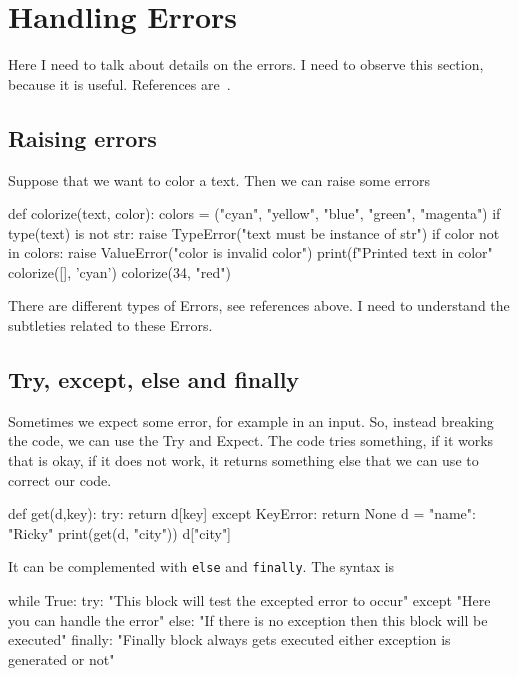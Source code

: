 \section{Handling Errors}

Here I need to talk about details on the errors. I need to observe this section, because it is useful. References are~\cite{geeks,errors, errors:types}.

\subsection{Raising errors}

Suppose that we want to color a text. Then we can raise some errors
\begin{listing}{1}
def colorize(text, color):
    colors = ("cyan", "yellow", "blue", "green", "magenta")
    if type(text) is not str:
        raise TypeError("text must be instance of str")
    if color not in colors:
        raise ValueError("color is invalid color")
    print(f"Printed {text} in {color}"
colorize([], 'cyan')
colorize(34, "red")    
\end{listing}
There are different types of Errors, see references above. I need to understand the subtleties related to these Errors.

\subsection{Try, except, else and finally}

Sometimes we expect some error, for example in an input. So, instead breaking the code, we can use the Try and Expect. The code tries something, if it works that is okay, if it does not work, it returns something else that we can use to correct our code.
\begin{listing}{1}
def get(d,key):
    try:
        return d[key]
    except KeyError:
        return None
d = {"name": "Ricky"}
print(get(d, "city"))
d["city"]    
\end{listing}

It can be complemented with \verb|else| and \verb|finally|. The syntax is 
\begin{listing}{1}
while True: 
    try: 
        "This block will test the excepted error to occur"
    except
        "Here you can handle the error"
    else: 
        "If there is no exception then this block will be executed"
    finally:
        "Finally block always gets executed either exception is generated or not"
\end{listing}

